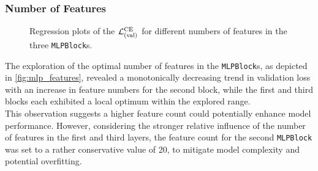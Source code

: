 \subsubsection{Number of Features}
\begin{figure}[H]
    \centering
    \caption{Regression plots of the \( \mathcal{L}_{(\text{val})}^{\text{CE}} \) for different numbers of features in the three \texttt{MLPBlock}s.}
    \label{fig:mlp_features}
\end{figure}

The exploration of the optimal number of features in the \texttt{MLPBlock}s, as depicted in \autoref{fig:mlp_features},
revealed a monotonically decreasing trend in validation loss with an increase in feature numbers for the second block, while
the first and third blocks each exhibited a local optimum within the explored range. \\
This observation suggests a higher feature count could potentially enhance model performance.
However, considering the stronger relative influence of the number of features in the first and third layers, the
feature count for the second \texttt{MLPBlock} was set to a rather conservative value of 20, to mitigate model complexity and
potential overfitting.

